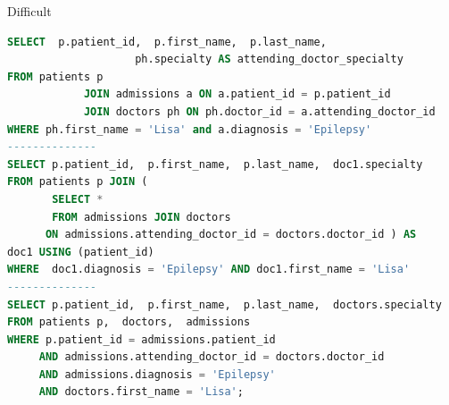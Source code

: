 \begin{exm} Difficult
\begin{lstlisting}[language=SQL]
SELECT  p.patient_id,  p.first_name,  p.last_name, 
                    ph.specialty AS attending_doctor_specialty
FROM patients p  
            JOIN admissions a ON a.patient_id = p.patient_id
            JOIN doctors ph ON ph.doctor_id = a.attending_doctor_id
WHERE ph.first_name = 'Lisa' and a.diagnosis = 'Epilepsy'
--------------
SELECT p.patient_id,  p.first_name,  p.last_name,  doc1.specialty
FROM patients p JOIN (
       SELECT *  
       FROM admissions JOIN doctors 
      ON admissions.attending_doctor_id = doctors.doctor_id ) AS
doc1 USING (patient_id)
WHERE  doc1.diagnosis = 'Epilepsy' AND doc1.first_name = 'Lisa'
--------------
SELECT p.patient_id,  p.first_name,  p.last_name,  doctors.specialty
FROM patients p,  doctors,  admissions
WHERE p.patient_id = admissions.patient_id
     AND admissions.attending_doctor_id = doctors.doctor_id
     AND admissions.diagnosis = 'Epilepsy'
     AND doctors.first_name = 'Lisa';
\end{lstlisting}
\end{exm}

